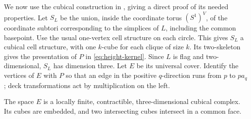 We now use the cubical construction in
\cite[Theorem~5.12]{BB1997}, giving a direct proof of its needed
properties. Let $S_L$ be the union, inside the coordinate torus $(S^1)^V$, of
the coordinate subtori corresponding to the simplices of $L$,
including the common basepoint.  Use the usual one-vertex cell
structure on each circle.  This gives $S_L$ a cubical cell structure,
with one $k$-cube for each clique of size $k$.  Its two-skeleton gives
the presentation of $P$ in \eqref{eq:height-kernel}.  Since $L$ is flag
and two-dimensional, $S_L$ has dimension three.  Let $E$ be its
universal cover.  Identify the vertices of $E$ with $P$ so that an
edge in the positive $q$-direction runs from $p$ to $pa_q$; deck
transformations act by multiplication on the left.

\begin{lemma}\label{lem:cubical-cover}
The space $E$ is a locally finite, contractible, three-dimensional
cubical complex.  Its cubes are embedded, and two intersecting cubes
intersect in a common face.
\end{lemma}

